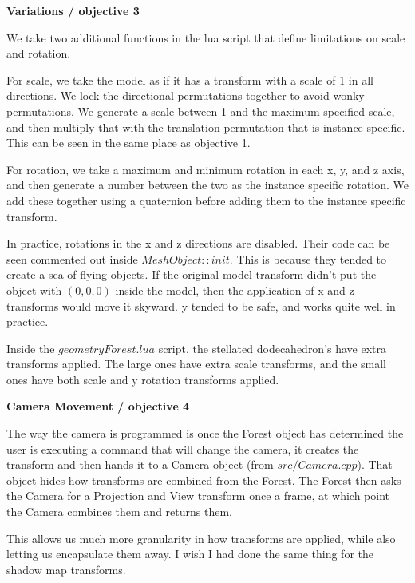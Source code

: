 \documentclass[10pt]{article}
\begin{document}
	\begin{center}
		\bf Variations / objective 3
	\end{center}
	
	We take two additional functions in the lua script that define limitations on scale and rotation. 
	
	For scale, we take the model as if it has a transform with a scale of 1 in all directions. We lock the directional permutations together to avoid wonky permutations. We generate a scale between 1 and the maximum specified scale, and then multiply that with the translation permutation that is instance specific. This can be seen in the same place as objective 1.
	
	For rotation, we take a maximum and minimum rotation in each x, y, and z axis, and then generate a number between the two as the instance specific rotation. We add these together using a quaternion before adding them to the instance specific transform.
	
	In practice, rotations in the x and z directions are disabled. Their code can be seen commented out inside $MeshObject::init$. This is because they tended to create a sea of flying objects. If the original model transform didn't put the object with $(0, 0, 0)$ inside the model, then the application of x and z transforms would move it skyward. y tended to be safe, and works quite well in practice.
	
	Inside the $geometryForest.lua$ script, the stellated dodecahedron's have extra transforms applied. The large ones have extra scale transforms, and the small ones have both scale and y rotation transforms applied.
	
	\begin{center}
		\bf Camera Movement / objective 4
	\end{center}
	
	The way the camera is programmed is once the Forest object has determined the user is executing a command that will change the camera, it creates the transform and then hands it to a Camera object (from $src/Camera.cpp$). That object hides how transforms are combined from the Forest. The Forest then asks the Camera for a Projection and View transform once a frame, at which point the Camera combines them and returns them.
	
	This allows us much more granularity in how transforms are applied, while also letting us encapsulate them away. I wish I had done the same thing for the shadow map transforms.
	
\end{document}
